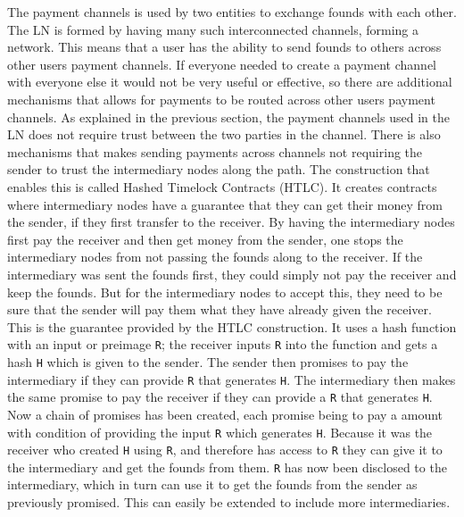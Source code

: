 The payment channels is used by two entities to exchange founds with each other. The LN is formed by having many such interconnected channels, forming a network. This means that a user has the ability to send founds to others across other users payment channels. If everyone needed to create a payment channel with everyone else it would not be very useful or effective, so there are additional mechanisms that allows for payments to be routed across other users payment channels.
As explained in the previous section, the payment channels used in the LN does not require trust between the two parties in the channel. There is also mechanisms that makes sending  payments across channels not requiring the sender to trust the intermediary nodes along the path. The construction that enables this is called Hashed Timelock Contracts (HTLC).
It creates contracts where intermediary nodes have a guarantee that they can get their money from the sender, if they first transfer to the receiver. By having the intermediary nodes first pay the receiver and then get money from the sender, one stops the intermediary nodes from not passing the founds along to the receiver. If the intermediary was sent the founds first, they could simply not pay the receiver and keep the founds. But for the intermediary nodes to accept this, they need to be sure that the sender will pay them what they have already given the receiver. This is the guarantee provided by the HTLC construction.
It uses a hash function with an input or preimage {\tt R}; the receiver inputs {\tt R} into the function and gets a hash {\tt H} which is given to the sender. The sender then promises to pay the intermediary if they can provide {\tt R} that generates {\tt H}. The intermediary then makes the same promise to pay the receiver if they can provide a {\tt R} that generates {\tt H}. Now a chain of promises has been created, each promise being to pay a amount with condition of providing the input {\tt R} which generates {\tt H}. Because it was the receiver who created {\tt H} using {\tt R}, and therefore has access to {\tt R} they can give it to the intermediary and get the founds from them. {\tt R} has now been disclosed to the intermediary, which in turn can use it to get the founds from the sender as previously promised. This can easily be extended to include more intermediaries.
\\

